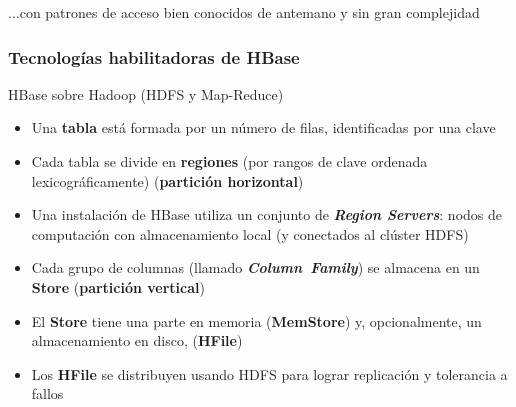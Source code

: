 \documentclass[14pt]{beamer}
\begin{document}
\begin{frame}
\begin{itemize}
\begin{frame}
  \begin{block}{}
    ...con patrones de acceso bien conocidos de antemano y sin gran
    complejidad
  \end{block}

\end{frame}

\begin{frame}[allowframebreaks]
  \frametitle{Tecnologías habilitadoras de HBase}
HBase sobre Hadoop (HDFS y Map-Reduce)
\begin{itemize}
\item Una {\bf tabla} está formada por un número de filas, identificadas
  por una clave
\item Cada tabla se divide en {\bf regiones} (por rangos de clave ordenada
  lexicográficamente) ({\bf partición horizontal})
\item Una instalación de HBase utiliza un conjunto de {\bfseries\itshape
    Region Servers}: nodos de computación con almacenamiento local (y
  conectados al clúster HDFS)

\framebreak

\item Cada grupo de columnas (llamado {\bfseries\itshape Column~Family\/})
  se almacena en un {\bf Store} ({\bf partición vertical})
\item El {\bf Store} tiene una parte en memoria ({\bf MemStore}) y,
  opcionalmente, un almacenamiento en disco, ({\bf HFile})
\item Los {\bf HFile} se distribuyen usando HDFS para lograr replicación y
  tolerancia a fallos
\end{itemize}
\end{frame}


\end{itemize}
\end{frame}
\end{document}
